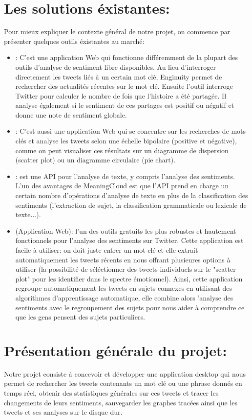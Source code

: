 \section{Les solutions éxistantes:}
Pour mieux expliquer le contexte général de notre projet, on commence par présenter quelques outils éxistantes au marché:
\begin{itemize}
    \item {}: C'est une application Web qui fonctionne différemment de la plupart des outils d'analyse de sentiment libre disponibles. Au lieu d'interroger directement les tweets liés à un certain mot clé, Enginuity permet de rechercher des actualités récentes sur le mot clé.
    Ensuite l'outil interroge Twitter pour calculer le nombre de fois que l'histoire a été partagée. Il analyse également si le sentiment de ces partages est positif ou négatif et donne une note de sentiment globale.
    \item {}: C'est aussi une application Web qui se concentre sur les recherches de mots clés et analyse les tweets selon une échelle bipolaire (positive et négative), comme on peut visualiser ces résultats sur un diagramme de dispersion (scatter plot) ou un diagramme circulaire (pie chart).
    \item {}: est une API pour l'analyse de texte, y compris l'analyse des sentiments. L'un des avantages de MeaningCloud est que l'API prend en charge un certain nombre d'opérations d'analyse de texte en plus de la classification des sentiments (l'extraction de sujet, la classification grammaticale ou lexicale de texte...).
    \item {} (Application Web): l'un des outils gratuits les plus robustes et hautement fonctionnels pour l'analyse des sentiments sur Twitter. Cette application est facile à utiliser: on doit juste entrer un mot clé et elle extrait automatiquement les tweets récents en nous offrant plusieures options à utiliser (la possibilité de séléctionner des tweets individuels sur le "scatter plot" pour les identifier dans le spectre émotionnel). Ainsi, cette application regroupe automatiquement les tweets en sujets connexes en utilisant des algorithmes d'apprentissage automatique, elle combine alors 'analyse des sentiments avec le regroupement des sujets pour nous aider à comprendre ce que les gens pensent des sujets particuliers.   
\end{itemize}

\section{Présentation générale du projet:}
Notre projet consiste à concevoir et développer une application desktop qui nous permet de rechercher les tweets contenants un mot clé ou une phrase donnés en temps réel, obtenir des statistiques générales sur ces tweets et tracer les changements de leurs sentiments, sauvegarder les graphes tracées ainsi que les tweets et ses analyses sur le disque dur.

